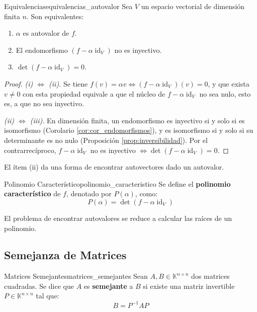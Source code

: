 \documentclass[11pt, a4paper]{article}
\begin{document}
\begin{proposicion}{Equivalencias}{equivalencias_autovalor}
Sea $V$ un espacio vectorial de dimensión finita $n$. Son equivalentes:
\begin{enumerate}
    \item[i)] $\alpha$ es autovalor de $f$.
    \item[ii)] El endomorfismo $(f - \alpha \operatorname{id}_V)$ no es inyectivo.
    \item[iii)] $\det(f - \alpha \operatorname{id}_V) = 0$.
\end{enumerate}
\end{proposicion}

\begin{proof}
\textit{(i) $\Leftrightarrow$ (ii).} Se tiene $f(v) = \alpha v \iff (f - \alpha \operatorname{id}_V)(v) = 0$, y que exista $v \neq 0$ con esta propiedad equivale a que el núcleo de $f - \alpha \operatorname{id}_V$ no sea nulo, esto es, a que no sea inyectivo.

\textit{(ii) $\Leftrightarrow$ (iii).} En dimensión finita, un endomorfismo es inyectivo si y solo si es isomorfismo (Corolario \ref{cor:cor_endomorfismos}), y es isomorfismo si y solo si su determinante es no nulo (Proposición \ref{prop:inversibilidad}). Por el contrarrecíproco, $f - \alpha \operatorname{id}_V$ no es inyectivo $\iff \det(f - \alpha \operatorname{id}_V) = 0$.
\end{proof}

\obs El ítem (ii) da una forma de encontrar autovectores dado un autovalor.

\begin{definicion}{Polinomio Característico}{polinomio_caracteristico}
Se define el \textbf{polinomio característico} de $f$, denotado por $P(\alpha)$, como:
\[ P(\alpha) = \det(f - \alpha \operatorname{id}_V) \]
\end{definicion}

\obs El problema de encontrar autovalores se reduce a calcular las raíces de un polinomio.

\subsection{Semejanza de Matrices}

\begin{definicion}{Matrices Semejantes}{matrices_semejantes}
Sean $A, B \in \mathbb{K}^{n \times n}$ dos matrices cuadradas. Se dice que $A$ es \textbf{semejante} a $B$ si existe una matriz invertible $P \in \mathbb{K}^{n \times n}$ tal que:
\[ B = P^{-1} A P \]
\end{definicion}
\end{document}
